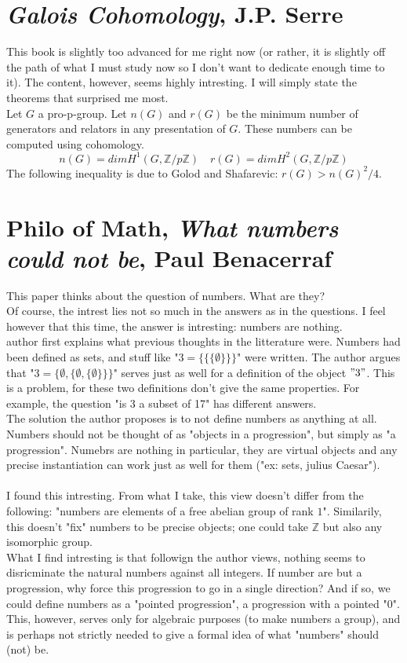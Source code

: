 \documentclass[11pt]{article}
\theoremstyle{definition}
\theoremstyle{example}
\theoremstyle{remark}
\theoremstyle{lemma}
\theoremstyle{proposition}
\theoremstyle{Problem}
\theoremstyle{Solution}
\theoremstyle{theorem}
\begin{document}
\section{\textit{Galois Cohomology}, J.P. Serre}
This book is slightly too advanced for me right now (or rather, it is slightly off the path of what I must study now so I don't want to dedicate enough time to it). The content, however, seems highly intresting. I will simply state the theorems that surprised me most.\\
Let $G$ a pro-p-group. Let $n(G)$ and $r(G)$ be the minimum number of generators and relators in any presentation of $G$. These numbers can be computed using cohomology.
$$n(G) = dim H^1(G, \mathbb{Z}/p\mathbb{Z}) \quad r(G) = dim H^2(G, \mathbb{Z}/p\mathbb{Z}) $$
The following inequality is due to Golod and Shafarevic: $r(G) > n(G)^2/4$.


\section{Philo of Math, \textit{What numbers could not be}, Paul Benacerraf}
This paper thinks about the question of numbers. What are they?\\
Of course, the intrest lies not so much in the answers as in the questions. I feel however that this time, the answer is intresting: numbers are nothing.\\
author first explains what previous thoughts in the litterature were. Numbers had been defined as sets, and stuff like "$3 = \{ \{ \{\emptyset\}\}\}$" were written. The author argues that "$3 = \{\emptyset, \{\emptyset, \{\emptyset\}\}\}$" serves just as well for a definition of the object $"3"$. This is a problem, for these two definitions don't give the same properties. For example, the question "is 3 a subset of 17" has different answers.\\
The solution the author proposes is to not define numbers as anything at all. Numbers should not be thought of as "objects in a progression", but simply as "a progression". Numebrs are nothing in particular, they are virtual objects and any precise instantiation can work just as well for them ("ex: sets, julius Caesar").\\ \\

I found this intresting. From what I take, this view doesn't differ from the following: "numbers are elements of a free abelian group of rank $1$". Similarily, this doesn't "fix" numbers to be precise objects; one could take $\mathbb{Z}$ but also any isomorphic group.\\
What I find intresting is that followign the author views, nothing seems to disricminate the natural numbers against all integers. If number are but a progression, why force this progression to go in a single direction? And if so, we could define numbers as a "pointed progression", a progression with a pointed "$0$". This, however, serves only for algebraic purposes (to make numbers a group), and is perhaps not strictly needed to give a formal idea of what "numbers" should (not) be.
\end{document}
